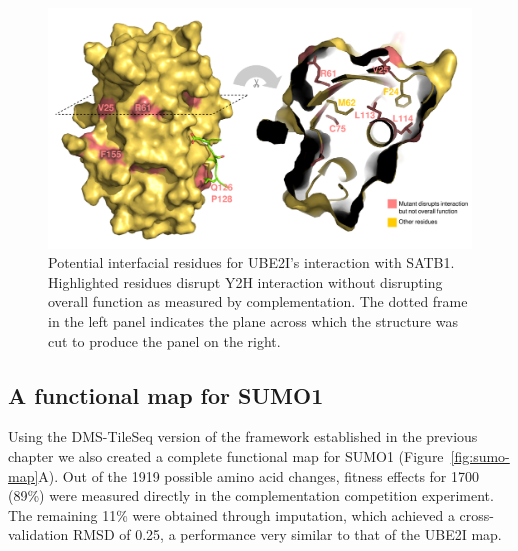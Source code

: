 \begin{figure}[h!]
	\centering
	\includegraphics[width=\textwidth]{img/satb1_interface.pdf}
	\caption{Potential interfacial residues for UBE2I's interaction with SATB1. Highlighted residues disrupt Y2H interaction without disrupting overall function as measured by complementation. The dotted frame in the left panel indicates the plane across which the structure was cut to produce the panel on the right.}
	\label{fig:y2hVScompl}
\end{figure}


\subsection{A functional map for SUMO1}

Using the DMS-TileSeq version of the framework established in the previous chapter we also created a complete functional map for SUMO1 (Figure~\ref{fig:sumo-map}A). Out of the 1919 possible amino acid changes, fitness effects for 1700 (89\%) were measured directly in the complementation competition experiment. The remaining 11\% were obtained through imputation, which achieved a cross-validation RMSD of 0.25, a performance very similar to that of the UBE2I map.

